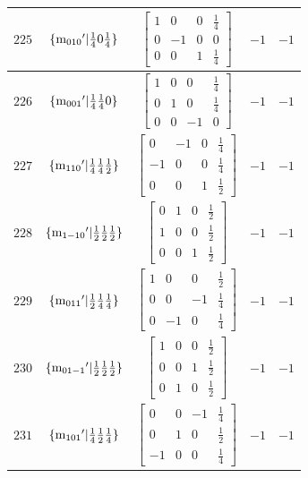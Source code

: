 \documentclass[fleqn,8pt]{jsarticle}
\begin{document}
\begin{longtable}{ccccc}
$ 225 $ & $ \{{\rm m}_{010}{}'|\frac{1}{4} 0 \frac{1}{4}\} $ & $ \begin{bmatrix} 1 & 0 & 0 & \frac{1}{4} \\ 0 & -1 & 0 & 0 \\ 0 & 0 & 1 & \frac{1}{4} \end{bmatrix} $ & $ -1 $ & $ -1 $ \\ \hline
$ 226 $ & $ \{{\rm m}_{001}{}'|\frac{1}{4} \frac{1}{4} 0\} $ & $ \begin{bmatrix} 1 & 0 & 0 & \frac{1}{4} \\ 0 & 1 & 0 & \frac{1}{4} \\ 0 & 0 & -1 & 0 \end{bmatrix} $ & $ -1 $ & $ -1 $ \\ \hline
$ 227 $ & $ \{{\rm m}_{110}{}'|\frac{1}{4} \frac{1}{4} \frac{1}{2}\} $ & $ \begin{bmatrix} 0 & -1 & 0 & \frac{1}{4} \\ -1 & 0 & 0 & \frac{1}{4} \\ 0 & 0 & 1 & \frac{1}{2} \end{bmatrix} $ & $ -1 $ & $ -1 $ \\ \hline
$ 228 $ & $ \{{\rm m}_{1-10}{}'|\frac{1}{2} \frac{1}{2} \frac{1}{2}\} $ & $ \begin{bmatrix} 0 & 1 & 0 & \frac{1}{2} \\ 1 & 0 & 0 & \frac{1}{2} \\ 0 & 0 & 1 & \frac{1}{2} \end{bmatrix} $ & $ -1 $ & $ -1 $ \\ \hline
$ 229 $ & $ \{{\rm m}_{011}{}'|\frac{1}{2} \frac{1}{4} \frac{1}{4}\} $ & $ \begin{bmatrix} 1 & 0 & 0 & \frac{1}{2} \\ 0 & 0 & -1 & \frac{1}{4} \\ 0 & -1 & 0 & \frac{1}{4} \end{bmatrix} $ & $ -1 $ & $ -1 $ \\ \hline
$ 230 $ & $ \{{\rm m}_{01-1}{}'|\frac{1}{2} \frac{1}{2} \frac{1}{2}\} $ & $ \begin{bmatrix} 1 & 0 & 0 & \frac{1}{2} \\ 0 & 0 & 1 & \frac{1}{2} \\ 0 & 1 & 0 & \frac{1}{2} \end{bmatrix} $ & $ -1 $ & $ -1 $ \\ \hline
$ 231 $ & $ \{{\rm m}_{101}{}'|\frac{1}{4} \frac{1}{2} \frac{1}{4}\} $ & $ \begin{bmatrix} 0 & 0 & -1 & \frac{1}{4} \\ 0 & 1 & 0 & \frac{1}{2} \\ -1 & 0 & 0 & \frac{1}{4} \end{bmatrix} $ & $ -1 $ & $ -1 $ \\ \hline

\end{longtable}
\end{document}
